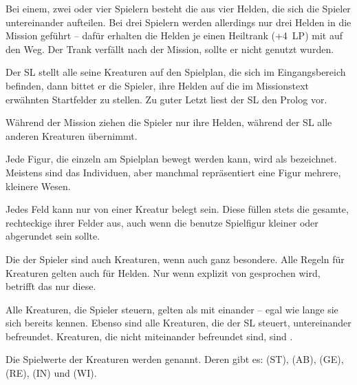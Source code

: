{		Bei einem, zwei oder vier Spielern besteht die  aus vier Helden, die sich die Spieler untereinander aufteilen. Bei drei Spielern werden allerdings nur drei Helden in die Mission geführt -- dafür erhalten die Helden je einen Heiltrank (+4~LP) mit auf den Weg. Der Trank verfällt nach der Mission, sollte er nicht genutzt wurden.

		Der SL stellt alle seine Kreaturen auf den Spielplan, die sich im Eingangsbereich befinden, dann bittet er die Spieler, ihre Helden auf die im Missionstext erwähnten Startfelder zu stellen. Zu guter Letzt liest der SL den Prolog vor.

		Während der Mission ziehen die Spieler nur ihre Helden, während der SL alle anderen Kreaturen übernimmt.

		Jede Figur, die einzeln am Spielplan bewegt werden kann, wird als  bezeichnet. Meistens sind das Individuen, aber manchmal repräsentiert eine Figur mehrere, kleinere Wesen.


		\noindent
		Jedes Feld kann nur von einer Kreatur belegt sein. Diese füllen stets die gesamte, rechteckige  ihrer Felder aus, auch wenn die benutze Spielfigur kleiner oder abgerundet sein sollte.

		Die  der Spieler sind auch Kreaturen, wenn auch ganz besondere. Alle Regeln für Kreaturen gelten auch für Helden. Nur wenn explizit von  gesprochen wird, betrifft das nur diese.


		\noindent
		Alle Kreaturen, die Spieler steuern, gelten als mit einander  -- egal wie lange sie sich bereits kennen. Ebenso sind alle Kreaturen, die der SL steuert, untereinander befreundet. Kreaturen, die nicht miteinander befreundet sind, sind .


		Die Spielwerte der Kreaturen werden  genannt. Deren gibt es:  (ST),  (AB),  (GE),  (RE),  (IN) und  (WI).

}
